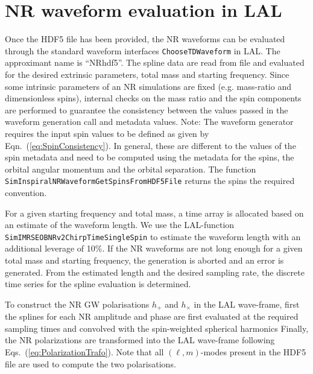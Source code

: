 \documentclass[11pt,tightenlines,article,amssymb,amsmath,amsfonts,superscriptaddress,nofootinbib]{revtex4}
\begin{document}
\section{NR waveform evaluation in LAL}
\label{sec:gen}
Once the HDF5 file has been provided, the NR waveforms can be evaluated through the standard waveform interfaces \texttt{ChooseTDWaveform} in LAL. The approximant name is ``NR\textunderscore hdf5''. 
The spline data are read from file and evaluated for the desired extrinsic parameters, total mass and starting frequency. Since some intrinsic parameters of an NR simulations are fixed (e.g. mass-ratio and dimensionless spins), internal checks on the mass ratio and the spin components are performed to guarantee the consistency between the values passed in the waveform generation call and metadata values. 
Note: The waveform generator requires the input spin values to be defined as given by Eqn.~(\ref{eq:SpinConsistency}). In general, these are different to the values of the spin metadata and need to be computed using the metadata for the spins, the orbital angular momentum and the orbital separation. The function \texttt{SimInspiralNRWaveformGetSpinsFromHDF5File} returns the spins the required convention. 

For a given starting frequency and total mass, a time array is allocated based on an estimate of the waveform length. We use the LAL-function 
\texttt{SimIMRSEOBNRv2ChirpTimeSingleSpin} to estimate the waveform length with an additional leverage of 10\%. If the NR waveforms are not long enough for a given total mass and starting frequency, the generation is aborted and an error is generated. From the estimated length and the desired sampling rate, the discrete time series for the spline evaluation is determined.

To construct the NR GW polarisations $h_+$ and $h_\times$ in the LAL
wave-frame, first the splines for each NR amplitude and phase are
first evaluated at the required sampling times and convolved with the
spin-weighted spherical harmonics
Finally, the NR polarizations are transformed into the LAL wave-frame following Eqs.~(\ref{eq:PolarizationTrafo}). Note that all $(\ell, m)$-modes present in the HDF5 file are used
to compute the two polarisations. 
\end{document}

